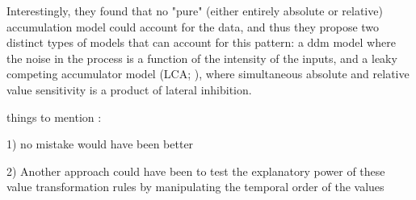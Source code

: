 \documentclass[11pt,a4paper]{article}
\begin{document}
Interestingly, they found that no "pure" (either entirely absolute or relative) accumulation model could account for the data, and thus they propose two distinct types  of models that can account for this pattern: a ddm model where the noise in the process is a function of the intensity of the inputs, and a leaky competing accumulator model (LCA; ), where simultaneous absolute and relative value sensitivity is a product of lateral inhibition. 

things to mention :

1) no mistake would have been better

2) Another approach could have been to test the explanatory power of these value transformation rules by manipulating the temporal order of the values



\newpage


\end{document}
